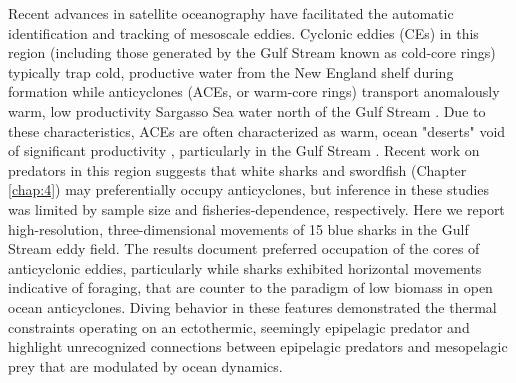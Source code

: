 Recent advances in satellite oceanography have facilitated the automatic identification and tracking of mesoscale eddies. Cyclonic eddies (CEs) in this region (including those generated by the Gulf Stream known as cold-core rings) typically trap cold, productive water from the New England shelf during formation \citep{Pingree1979, RingGroup1981} while anticyclones (ACEs, or warm-core rings) transport anomalously warm, low productivity Sargasso Sea water north of the Gulf Stream \citep{Joyce1985, Franks1986}. Due to these characteristics, ACEs are often characterized as warm, ocean "deserts" void of significant productivity \citep{Williams1998}, particularly in the Gulf Stream \citep{Gaube2014}. Recent work on predators in this region suggests that white sharks \citep{Gaube2018} and swordfish (Chapter \ref{chap:4}) may preferentially occupy anticyclones, but inference in these studies was limited by sample size and fisheries-dependence, respectively. Here we report high-resolution, three-dimensional movements of 15 blue sharks in the Gulf Stream eddy field. The results document preferred occupation of the cores of anticyclonic eddies, particularly while sharks exhibited horizontal movements indicative of foraging, that are counter to the paradigm of low biomass in open ocean anticyclones. Diving behavior in these features demonstrated the thermal constraints operating on an ectothermic, seemingly epipelagic predator and highlight unrecognized connections between epipelagic predators and mesopelagic prey that are modulated by ocean dynamics.


